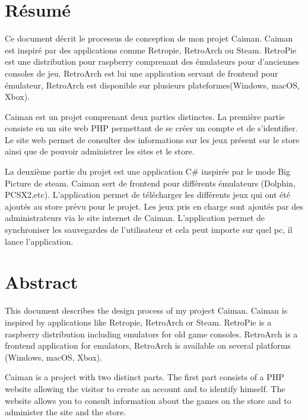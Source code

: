 \documentclass[a4paper,12pt,french]{sphinxmanual}
\begin{document}
\section{Résumé}
\label{\detokenize{introduction:resume}}
\sphinxAtStartPar
Ce document décrit le processus de conception de mon projet Caiman. Caiman est inspiré par des applications comme Retropie, RetroArch ou Steam. RetroPie est une distribution pour raspberry comprenant des émulateurs pour d’anciennes consoles de jeu. RetroArch est lui une application servant de frontend pour émulateur, RetroArch est disponible sur plusieurs plateformes(Windows, macOS, Xbox).

\sphinxAtStartPar
Caiman est un projet comprenant deux parties distinctes. La première partie consiste en un site web PHP permettant de se créer un compte et de s’identifier. Le site web permet de consulter des informations sur les jeux présent sur le store ainsi que de pouvoir administrer les sites et le store.

\sphinxAtStartPar
La deuxième partie du projet est une application C\# inspirée par le mode Big Picture de steam. Caiman sert de frontend pour différents émulateurs (Dolphin, PCSX2,etc). L’application permet de télécharger les différents jeux qui ont été ajoutés au store prévu pour le projet. Les jeux pris en charge sont ajoutés par des administrateurs via le site internet de Caiman. L’application permet de synchroniser les sauvegardes de l’utilisateur et cela peut importe sur quel pc, il lance l’application.

\sphinxAtStartPar
{}


\section{Abstract}
\label{\detokenize{introduction:abstract}}
\sphinxAtStartPar
This document describes the design process of my project Caiman. Caiman is inspired by applications like Retropie, RetroArch or Steam. RetroPie is a raspberry distribution including emulators for old game consoles. RetroArch is a frontend application for emulators, RetroArch is available on several platforms (Windows, macOS, Xbox).

\sphinxAtStartPar
Caiman is a project with two distinct parts. The first part consists of a PHP website allowing the visitor to create an account and to identify himself. The website allows you to consult information about the games on the store and to administer the site and the store.
\end{document}
